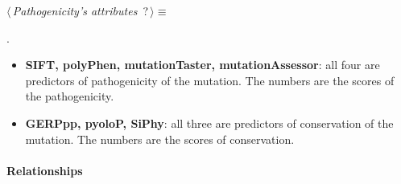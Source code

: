 	\begin{flushleft} \small
\begin{minipage}{\linewidth}\label{scrap8}\raggedright\small
{} $\langle\,${\itshape {Pathogenicity's attributes}}\nobreak\ {\footnotesize {?}}$\,\rangle\equiv$
\vspace{-1ex}
\begin{list}{}{} \item

                
        {\NWsep}
\end{list}
\vspace{-1.5ex}
\footnotesize
\begin{list}{}{\setlength{\itemsep}{-\parsep}\setlength{\itemindent}{-\leftmargin}}
\item {\NWtxtMacroNoRef}.

\item{}
\end{list}
\end{minipage}\vspace{4ex}
\end{flushleft}
\begin{itemize}
 	\item \textbf{SIFT, polyPhen, mutationTaster, mutationAssessor}: all four are predictors of pathogenicity of the mutation. The numbers are the scores of the pathogenicity.
 	\item \textbf{GERPpp, pyoloP, SiPhy}: all three are predictors of conservation of the mutation. The numbers are the scores of conservation.
\end{itemize}

\paragraph{Relationships} 

